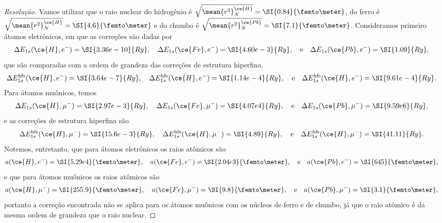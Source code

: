 \begin{proof}[Resolução]
   Vamos utilizar que o raio nuclear do hidrogênio é \(\sqrt{\mean{r^2}_N^{\ce{H}}} = \SI{0.84}{\femto\meter}\), do ferro é \(\sqrt{\mean{r^2}_N^{\ce{H}}} = \SI{4.6}{\femto\meter}\) e do chumbo é \(\sqrt{\mean{r^2}_N^{\ce{Pb}}} = \SI{7.1}{\femto\meter}\). Consideramos primeiro átomos eletrônicos, em que as correções são dadas por
   \begin{equation*}
      \Delta E_{1s}(\ce{H}, e^{-}) = \SI{3.36e-10}{Ry},\quad
      \Delta E_{1s}(\ce{Fe}, e^{-}) = \SI{4.60e-3}{Ry},\quad\text{e}\quad
      \Delta E_{1s}(\ce{Pb}, e^{-}) = \SI{1.09}{Ry},
   \end{equation*}
   que são comparadas com a ordem de grandeza das correções de estrutura hiperfina,
   \begin{equation*}
      \Delta E^{\mathrm{hfs}}_{1s}(\ce{H}, e^{-}) = \SI{3.64e-7}{Ry},\quad
      \Delta E^{\mathrm{hfs}}_{1s}(\ce{H}, e^{-}) = \SI{1.14e-4}{Ry},\quad\text{e}\quad
      \Delta E^{\mathrm{hfs}}_{1s}(\ce{H}, e^{-}) = \SI{9.61e-4}{Ry}.
   \end{equation*}
   Para átomos muônicos, temos
   \begin{equation*}
      \Delta E_{1s}(\ce{H}, \mu^-) = \SI{2.97e-3}{Ry},\quad
      \Delta E_{1s}(\ce{Fe}, \mu^-) = \SI{4.07e4}{Ry},\quad\text{e}\quad
      \Delta E_{1s}(\ce{Pb},\mu^-) = \SI{9.59e6}{Ry},
   \end{equation*}
   e as correções de estrutura hiperfina são
   \begin{equation*}
      \Delta E^{\mathrm{hfs}}_{1s}(\ce{H}, \mu^{-}) = \SI{15.6e-3}{Ry},\quad
      \Delta E^{\mathrm{hfs}}_{1s}(\ce{H}, \mu^{-}) = \SI{4.89}{Ry},\quad\text{e}\quad
      \Delta E^{\mathrm{hfs}}_{1s}(\ce{H}, \mu^{-}) = \SI{41.11}{Ry}.
   \end{equation*}
   Notemos, entretanto, que para átomos eletrônicos os raios atômicos são
   \begin{equation*}
      a(\ce{H},e^-) = \SI{5.29e4}{\femto\meter},\quad
      a(\ce{Fe},e^-) = \SI{2.04e3}{\femto\meter},\quad\text{e}\quad
      a(\ce{Pb},e^-) = \SI{645}{\femto\meter},
   \end{equation*}
   e que para átomos muônicos os raios atômicos são
   \begin{equation*}
      a(\ce{H},\mu^-) = \SI{255.9}{\femto\meter},\quad
      a(\ce{Fe},\mu^-) = \SI{9.8}{\femto\meter},\quad\text{e}\quad
      a(\ce{Pb},\mu^-) = \SI{3.1}{\femto\meter},
   \end{equation*}
   portanto a correção encontrada não se aplica para os átomos muônicos com os núcleos de ferro e de chumbo, já que o raio atômico é da mesma ordem de grandeza que o raio nuclear.
\end{proof}
